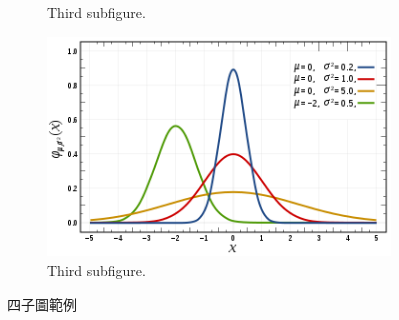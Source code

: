 \begin{figure}[!htb]
\begin{subfigure}{0.4\textwidth}
        \caption{Third subfigure.}
        \label{fig:third}
    \end{subfigure}
    \hfill
    \begin{subfigure}{0.4\textwidth}
        \includegraphics[width=\textwidth]{figures/gambar.png}
        \caption{Third subfigure.}
        \label{fig:fourth}
    \end{subfigure}
    \caption{四子圖範例}
    \label{fig:four graphs}
\end{figure}

